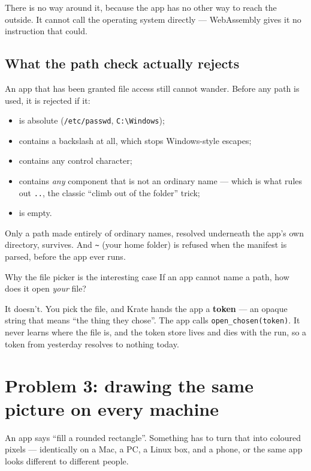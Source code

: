 \documentclass[11pt,a4paper]{report}
\begin{document}
There is no way around it, because the app has no other way to reach the
outside. It cannot call the operating system directly --- WebAssembly gives
it no instruction that could.

\subsection{What the path check actually rejects}

An app that has been granted file access still cannot wander. Before any
path is used, it is rejected if it:

\begin{itemize}[leftmargin=*]
  \item is absolute (\texttt{/etc/passwd}, \texttt{C:\textbackslash Windows});
  \item contains a backslash at all, which stops Windows-style escapes;
  \item contains any control character;
  \item contains \emph{any} component that is not an ordinary name --- which
    is what rules out \texttt{..}, the classic ``climb out of the folder''
    trick;
  \item is empty.
\end{itemize}

Only a path made entirely of ordinary names, resolved underneath the app's
own directory, survives. And \texttt{\textasciitilde} (your home folder) is
refused when the manifest is parsed, before the app ever runs.

\begin{plainbox}{Why the file picker is the interesting case}
If an app cannot name a path, how does it open \emph{your} file?

It doesn't. You pick the file, and Krate hands the app a \textbf{token} ---
an opaque string that means ``the thing they chose''. The app calls
\texttt{open\_chosen(token)}. It never learns where the file is, and the
token store lives and dies with the run, so a token from yesterday resolves
to nothing today.
\end{plainbox}

\section{Problem 3: drawing the same picture on every machine}

An app says ``fill a rounded rectangle''. Something has to turn that into
coloured pixels --- identically on a Mac, a PC, a Linux box, and a phone,
or the same app looks different to different people.
\end{document}
